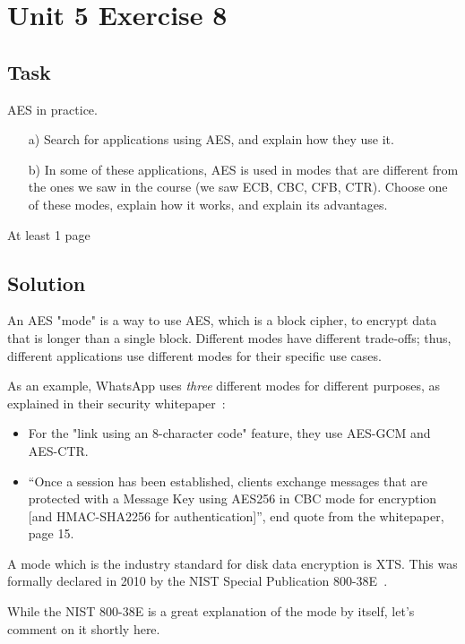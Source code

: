 \section{Unit 5 Exercise 8}

\subsection{Task}
AES in practice.

\begin{enumerate}
    \item[a)] Search for applications using AES, and explain how they use it.
    \item[b)] In some of these applications, AES is used in modes that are different from the ones we saw in the course (we saw ECB, CBC, CFB, CTR). Choose one of these modes, explain how it works, and explain its advantages.
\end{enumerate}

At least 1 page

\subsection{Solution}

An AES "mode" is a way to use AES, which is a block cipher, to encrypt data that is longer than a single block.
Different modes have different trade-offs; thus, different applications use different modes for their specific use cases.

As an example, WhatsApp uses \textit{three} different modes for different purposes, as explained in their security whitepaper~\cite{whatsapp}:
\begin{itemize}
    \item For the "link using an 8-character code" feature, they use AES-GCM and AES-CTR.
    \item ``Once a session has been established, clients exchange messages that are protected with a Message Key using AES256 in CBC mode for encryption [and HMAC-SHA2256 for authentication]'', end quote from the whitepaper, page 15.
\end{itemize}

A mode which is the industry standard for disk data encryption is XTS\@.
This was formally declared in 2010 by the NIST Special Publication 800-38E~\cite{NIST-XTS}.

While the NIST 800-38E is a great explanation of the mode by itself, let's comment on it shortly here.

